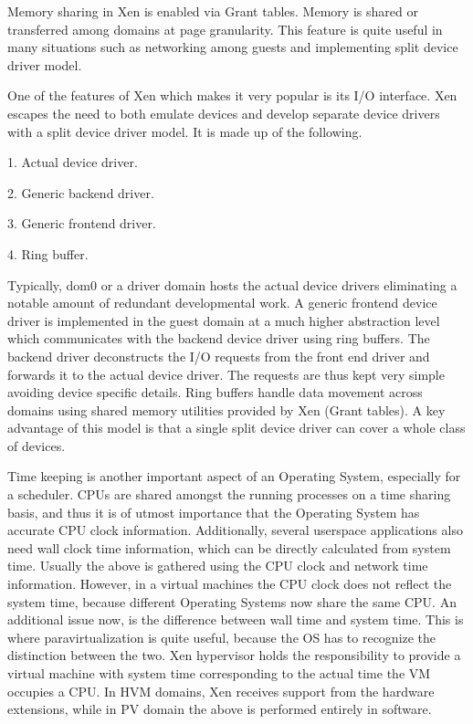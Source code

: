 Memory sharing in Xen is enabled via Grant tables. Memory is shared or transferred among domains at page granularity. This feature is quite useful in many situations such as networking among guests and implementing split device driver model. 

One of the features of Xen which makes it very popular is its I/O interface. Xen escapes the need to both emulate devices and develop separate device drivers with a split device driver model. It is made up of the following. 

1. Actual device driver. 

2. Generic backend driver. 

3. Generic frontend driver. 

4. Ring buffer. 

Typically, dom0 or a driver domain hosts the actual device drivers eliminating a notable amount of redundant developmental work. A generic frontend device driver is implemented in the guest domain at a much higher abstraction level which communicates with the backend device driver using ring buffers. The backend driver deconstructs the I/O requests from the front end driver and forwards it to the actual device driver. The requests are thus kept very simple avoiding device specific details. Ring buffers handle data movement across domains using shared memory utilities provided by Xen (Grant tables).  A key advantage of this model is that a single split device driver can cover a whole class of devices. 

Time keeping is another important aspect of an Operating System, especially for a scheduler. CPUs are shared amongst the running processes on a time sharing basis, and thus it is of utmost importance that the Operating System has accurate CPU clock information. Additionally, several userspace applications also need wall clock time information, which can be directly calculated from system time. Usually the above is gathered using the CPU clock and network time information. However, in a virtual machines the CPU clock does not reflect the system time, because different Operating Systems now share the same CPU. An additional issue now, is the difference between wall time and system time. This is where paravirtualization is quite useful, because the OS has to recognize the distinction between the two. Xen hypervisor holds the responsibility to provide a virtual machine with system time corresponding to the actual time the VM occupies a CPU. In HVM domains, Xen receives support from the hardware extensions, while in PV domain the above is performed entirely in software. 

